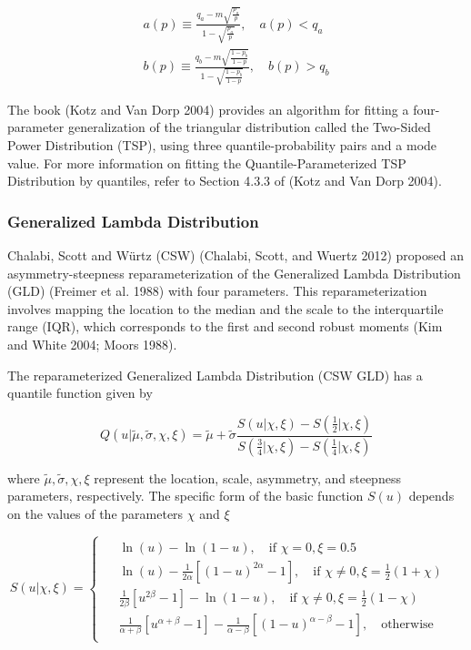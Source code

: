\documentclass[
]{interact}
\begin{document}
\[
\begin{gathered}
a(p) \equiv \frac{q_a-m\sqrt{\frac{p_a}{p}}}{1-\sqrt{\frac{p_a}{p}}}, \quad a(p)<q_a\\
b(p) \equiv \frac{q_b-m\sqrt{\frac{1-p_b}{1-p}}}{1-\sqrt{\frac{1-p_b}{1-p}}}, \quad b(p)>q_b
\end{gathered}
\]

The book (Kotz and Van Dorp 2004) provides an algorithm for fitting a
four-parameter generalization of the triangular distribution called the
Two-Sided Power Distribution (TSP), using three quantile-probability
pairs and a mode value. For more information on fitting the
Quantile-Parameterized TSP Distribution by quantiles, refer to Section
4.3.3 of (Kotz and Van Dorp 2004).

\subsubsection{Generalized Lambda Distribution}\label{sec-gld}

Chalabi, Scott and Würtz (CSW) (Chalabi, Scott, and Wuertz 2012)
proposed an asymmetry-steepness reparameterization of the Generalized
Lambda Distribution (GLD) (Freimer et al. 1988) with four parameters.
This reparameterization involves mapping the location to the median and
the scale to the interquartile range (IQR), which corresponds to the
first and second robust moments (Kim and White 2004; Moors 1988).

The reparameterized Generalized Lambda Distribution (CSW GLD) has a
quantile function given by

\[
Q(u\vert\tilde\mu,\tilde\sigma,\chi,\xi)=\tilde\mu+\tilde\sigma\frac{S\left(u\vert\chi,\xi\right)-S\left(\frac{1}{2}\vert\chi,\xi\right)}{S\left(\frac{3}{4}\vert\chi,\xi\right)-S\left(\frac{1}{4}\vert\chi,\xi\right)}
\]

where \(\tilde\mu,\tilde\sigma,\chi,\xi\) represent the location, scale,
asymmetry, and steepness parameters, respectively. The specific form of
the basic function \(S(u)\) depends on the values of the parameters
\(\chi\) and \(\xi\)

\[
S(u\vert\chi,\xi)=
\begin{cases}
\begin{aligned}
&\ln(u)-\ln(1-u),  \quad \text{if }\chi=0,\xi=0.5&\\
&\ln(u)-\frac{1}{2\alpha}\left[(1-u)^{2\alpha}-1\right], \quad \text{if }\chi\neq0,\xi=\frac{1}{2}(1+\chi)&\\
&\frac{1}{2\beta}\left[u^{2\beta}-1\right]-\ln(1-u), \quad \text{if }\chi\neq0,\xi=\frac{1}{2}(1-\chi)&\\
&\frac{1}{\alpha+\beta}\left[u^{\alpha+\beta}-1\right]-\frac{1}{\alpha-\beta}\left[(1-u)^{\alpha-\beta}-1\right], \quad \text{otherwise}
\end{aligned}
\end{cases}
\]
\end{document}
